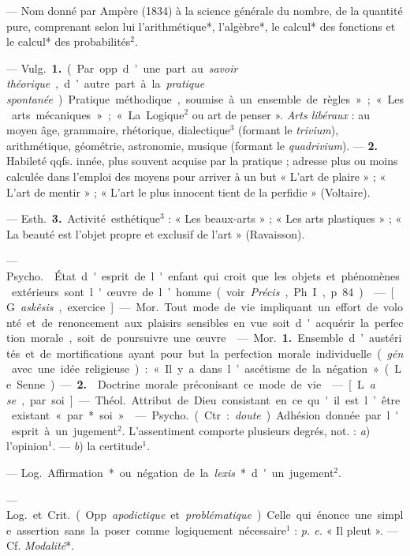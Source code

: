 \begin{itemize}[leftmargin=1cm, label=, itemsep=1pt]
{{ — Nom donné par Ampère (1834) à la science générale du
nombre, de la quantité pure, comprenant selon lui l’arithmétique*,
l’algèbre*, le calcul* des fonctions
et le calcul* des probabilités$^2$.

 — \si{Vulg.} {\bf 1.} (Par opp. d’une part
au {\it savoir théorique}, d’autre part à la
{\it pratique spontanée}). Pratique méthodique, soumise à un ensemble de
règles » ; « Les arts mécaniques » ;
« La Logique$^2$ ou art de penser ».
{\it Arts libéraux} : au moyen âge, grammaire,
rhétorique, dialectique$^3$ (formant le {\it trivium}), arithmétique, géométrie,
astronomie, musique (formant le {\it quadrivium}). — {\bf 2.} Habileté
qqfs. innée, plus souvent acquise
par la pratique ; adresse plus ou
moins calculée dans l'emploi des
moyens pour arriver à un but
« L'art de plaire » ; « L'art de mentir » ;
« L'art le plus innocent tient de la
perfidie » (Voltaire).

— \si{Esth.} {\bf 3.} Activité esthétique$^3$ :
« Les beaux-arts » ; « Les arts plastiques » ; « La beauté est l’objet
propre et exclusif de l’art » (Ravaisson).

 — \si{Psycho.}  État d'esprit
de l'enfant qui croit que les objets
et phénomènes extérieurs sont l'œuvre de l’homme (voir {\it Précis}, Ph. I,
p. 84).

 — [G. {\it askêsis}, exercice] — \si{Mor.}
Tout mode de vie impliquant un
effort de volonté et de renoncement
aux plaisirs sensibles en vue soit
d'acquérir la perfection morale, soit
de poursuivre une œuvre.

 — \si{Mor.} {\bf 1.} Ensemble d’austérités et de mortifications ayant
pour but la perfection morale individuelle ({\it gén}. avec une idée
religieuse) : « Il y a dans l’ascétisme de
la négation » (Le Senne). — {\bf 2.} 
Doctrine morale préconisant ce
mode de vie.

 — [L. {\it a se}, par soi] — \si{Théol.}
Attribut de Dieu consistant en ce
qu'il est l’être existant « par* soi ».

 — \si{Psycho.} (Ctr. : {\it doute}).
Adhésion donnée par l'esprit à un
jugement$^2$. L’assentiment comporte
plusieurs degrés, not. : {\it a}) l'opinion$^1$.
— {\it b}) la certitude$^1$.

 — \si{Log.} Affirmation* ou
négation de la {\it lexis}* d'un jugement$^2$.

 — \si{Log.}
et \si{Crit.} (Opp. {\it apodictique} et {\it problématique}). Celle qui énonce une
simple assertion sans la poser comme
logiquement nécessaire$^1$ : {\it p. e.} « Il
pleut ». — Cf.  {\it Modalité}*.


}}
\end{itemize}
